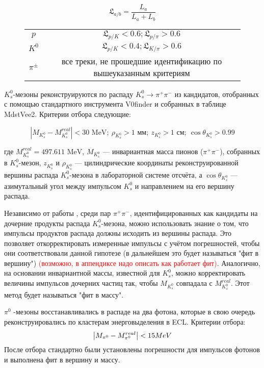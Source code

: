 $$\mathfrak{L}_{a/b} = \frac{L_a}{L_a + L_b}$$

\begin{figure}[h]
    \centering
    \begin{tabular}{c|c}
        $p$   & $\mathfrak{L}_{p/K} < 0.6; \mathfrak{L}_{p/\pi} > 0.6$ \\
        $K^0$   & $\mathfrak{L}_{p/K} < 0.4; \mathfrak{L}_{K/\pi} > 0.6$ \\
        $\pi^{\pm}$ & все треки, не прошедшие идентификацию по вышеуказанным критериям
    \end{tabular}
\end{figure}

\newdot $K_s^0$-мезоны реконструируются по распаду $K_s^0 \to \pi^+ \pi^-$ из кандидатов, отобранных с помощью стандартного инструмента V0finder и собранных в таблице MdstVee2. Критерии отбора следующие:

$$
\left| M_{K_s^0} - M^{real}_{K_s^0} \right| < 30 \text{ MeV}; \ \rho_{K_s^0} > 1 \text{ мм}; \ z_{K_s^0} > 1 \text{ см}; \ \cos \theta_{K_s^0} > 0.99
$$

где $M^{real}_{K_s^0} = 497.611 \text{ MeV}$, $M_{K_s^0}$ — инвариантная масса пионов ($\pi^+ \pi^-$), собранных в $K_s^0$-мезон, $z_{K_s^0}$ и $\rho_{K_s^0}$ — цилиндрические координаты реконструированной вершины распада $K_s^0$-мезона в лабораторной системе отсчёта, а $\cos \theta_{K_s^0}$ — азимутальный угол между импульсом $K_s^0$ и направлением на его вершину распада.

Независимо от работы \cite*{BelleDetector2002}, среди пар $\pi^+ \pi^-$, идентифицированных как кандидаты на дочерние продукты распада $K_s^0$-мезона, можно использовать знание о том, что импульсы продуктов распада должны исходить из вершины распада. Это позволяет откорректировать измеренные импульсы с учётом погрешностей, чтобы они соответствовали данной гипотезе (в дальнейшем это будет называться "фит в вершину") 
\textcolor{red}{(возможно, в аппендиксе надо описать как работает фит)}. Аналогично, на основании инвариантной массы, известной для $K_s^0$, можно корректировать величины импульсов дочерних частиц так, чтобы $M_{K_s^0}$ совпадала с $M^{real}_{K_s^0}$. Этот метод будет называться "фит в массу".

\newdot $\pi^0$ -мезоны восстанавливались в распаде на два фотона, которые в
свою очередь реконструировались по кластерам энерговыделения в ECL.
Критерии отбора:
$$
\abs{M_{\pi^0} - M_{\pi^0}^{real}} < 15 MeV 
$$
После отбора стандартно были установлены погрешности для импульсов фотонов и выполнена фит в вершину и массу.




